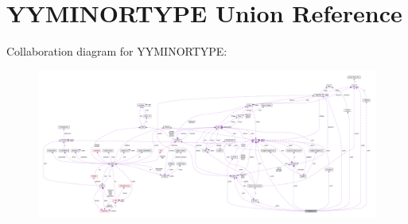 \hypertarget{union_y_y_m_i_n_o_r_t_y_p_e}{\section{Y\-Y\-M\-I\-N\-O\-R\-T\-Y\-P\-E Union Reference}
\label{union_y_y_m_i_n_o_r_t_y_p_e}
}


Collaboration diagram for Y\-Y\-M\-I\-N\-O\-R\-T\-Y\-P\-E\-:\nopagebreak
\begin{figure}[H]
\begin{center}
\leavevmode
\includegraphics[width=350pt]{union_y_y_m_i_n_o_r_t_y_p_e__coll__graph}
\end{center}
\end{figure}
